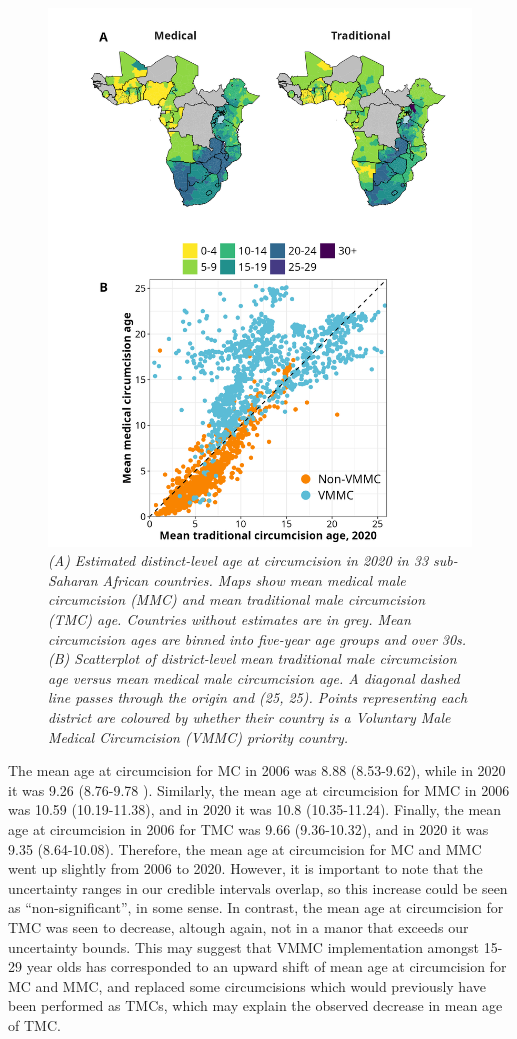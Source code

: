 \documentclass{article}
\begin{document}
\begin{figure}[H]
    \centering
    \includegraphics[width=.9\linewidth]
    {figures/paper/04_map_plot_mean_circ_age.png}
    \caption{\emph{(A) Estimated distinct-level age at circumcision in 2020 in 33 sub-Saharan African countries. Maps show mean medical male circumcision (MMC) and mean traditional male circumcision (TMC) age. Countries without estimates are in grey. Mean circumcision ages are binned into five-year age groups and over 30s. (B) Scatterplot of district-level mean traditional male circumcision age versus mean medical male circumcision age. A diagonal dashed line passes through the origin and (25, 25). Points representing each district are coloured by whether their country is a Voluntary Male Medical Circumcision (VMMC) priority country.}}
\end{figure}

The mean age at circumcision for MC in 2006 was 8.88 (8.53-9.62), while in 2020 it was 9.26 (8.76-9.78
). Similarly, the mean age at circumcision for MMC in 2006 was 10.59 (10.19-11.38), and in 2020 it was
10.8 (10.35-11.24). Finally, the mean age at circumcision in 2006 for TMC was 9.66 (9.36-10.32), and in
2020 it was 9.35 (8.64-10.08). 
Therefore, the mean age at circumcision for MC and MMC went up slightly from
2006 to 2020. However, it is important to note that the uncertainty ranges in our credible intervals overlap,
so this increase could be seen as “non-significant”, in some sense. In contrast, the mean age at circumcision
for TMC was seen to decrease, altough again, not in a manor that exceeds our uncertainty bounds. This may
suggest that VMMC implementation amongst 15-29 year olds has corresponded to an upward shift of mean
age at circumcision for MC and MMC, and replaced some circumcisions which would previously have been
performed as TMCs, which may explain the observed decrease in mean age of TMC.
\end{document}
